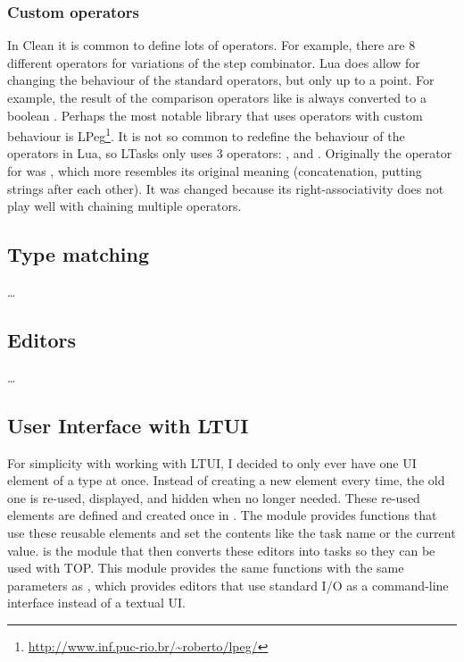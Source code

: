 \subsubsection{Custom operators}
In Clean it is common to define lots of operators. For example, there are 8 different operators for variations of the step combinator. Lua does allow for changing the behaviour of the standard operators, but only up to a point. For example, the result of the comparison operators like \lua{<} is always converted to a boolean \cite{luareferencemanual}. Perhaps the most notable library that uses operators with custom behaviour is LPeg\footnote{\url{http://www.inf.puc-rio.br/~roberto/lpeg/}}. It is not so common to redefine the behaviour of the operators in Lua, so LTasks only uses 3 operators: \lua{~}, \lua{&} and \lua{|}. Originally the operator for  was , which more resembles its original meaning (concatenation, putting strings after each other). It was changed because its right-associativity does not play well with chaining multiple operators.

\subsection{Type matching}
\dots

\subsection{Editors}
\dots

\subsection{User Interface with LTUI}
For simplicity with working with LTUI, I decided to only ever have one UI element of a type at once. Instead of creating a new element every time, the old one is re-used, displayed, and hidden when no longer needed. These re-used elements are defined and created once in .
The module  provides functions that use these reusable elements and set the contents like the task name or the current value.
 is the module that then converts these editors into tasks so they can be used with TOP. This module provides the same functions with the same parameters as , which provides editors that use standard I/O as a command-line interface instead of a textual UI.
